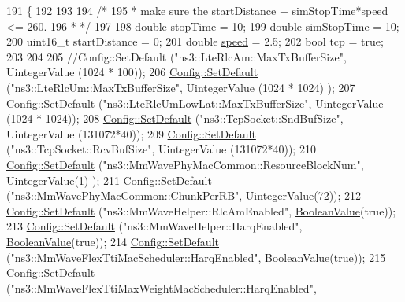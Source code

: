 \begin{DoxyCode}
191 \{
192 
193 
194 \textcolor{comment}{/*}
195 \textcolor{comment}{ * make sure the startDistance + simStopTime*speed <= 260.}
196 \textcolor{comment}{ * */}
197 
198         \textcolor{keywordtype}{double} stopTime = 10;
199         \textcolor{keywordtype}{double} simStopTime = 10;
200         uint16\_t startDistance = 0;
201         \textcolor{keywordtype}{double} \hyperlink{mmwave-amc-test_8cc_a6dc6e6f3c75c509ce943163afb5dade7}{speed} = 2.5;
202         \textcolor{keywordtype}{bool} tcp = \textcolor{keyword}{true};
203 
204 
205         \textcolor{comment}{//Config::SetDefault ("ns3::LteRlcAm::MaxTxBufferSize", UintegerValue (1024 * 100));}
206         \hyperlink{group__config_ga2e7882df849d8ba4aaad31c934c40c06}{Config::SetDefault} (\textcolor{stringliteral}{"ns3::LteRlcUm::MaxTxBufferSize"}, UintegerValue (1024 * 1024)
      );
207         \hyperlink{group__config_ga2e7882df849d8ba4aaad31c934c40c06}{Config::SetDefault} (\textcolor{stringliteral}{"ns3::LteRlcUmLowLat::MaxTxBufferSize"}, UintegerValue (1024 *
       1024));
208         \hyperlink{group__config_ga2e7882df849d8ba4aaad31c934c40c06}{Config::SetDefault} (\textcolor{stringliteral}{"ns3::TcpSocket::SndBufSize"}, UintegerValue (131072*40));
209         \hyperlink{group__config_ga2e7882df849d8ba4aaad31c934c40c06}{Config::SetDefault} (\textcolor{stringliteral}{"ns3::TcpSocket::RcvBufSize"}, UintegerValue (131072*40));
210         \hyperlink{group__config_ga2e7882df849d8ba4aaad31c934c40c06}{Config::SetDefault} (\textcolor{stringliteral}{"ns3::MmWavePhyMacCommon::ResourceBlockNum"}, UintegerValue(1)
      );
211         \hyperlink{group__config_ga2e7882df849d8ba4aaad31c934c40c06}{Config::SetDefault} (\textcolor{stringliteral}{"ns3::MmWavePhyMacCommon::ChunkPerRB"}, UintegerValue(72));
212         \hyperlink{group__config_ga2e7882df849d8ba4aaad31c934c40c06}{Config::SetDefault} (\textcolor{stringliteral}{"ns3::MmWaveHelper::RlcAmEnabled"}, 
      \hyperlink{classns3_1_1BooleanValue}{BooleanValue}(\textcolor{keyword}{true}));
213         \hyperlink{group__config_ga2e7882df849d8ba4aaad31c934c40c06}{Config::SetDefault} (\textcolor{stringliteral}{"ns3::MmWaveHelper::HarqEnabled"}, 
      \hyperlink{classns3_1_1BooleanValue}{BooleanValue}(\textcolor{keyword}{true}));
214         \hyperlink{group__config_ga2e7882df849d8ba4aaad31c934c40c06}{Config::SetDefault} (\textcolor{stringliteral}{"ns3::MmWaveFlexTtiMacScheduler::HarqEnabled"}, 
      \hyperlink{classns3_1_1BooleanValue}{BooleanValue}(\textcolor{keyword}{true}));
215         \hyperlink{group__config_ga2e7882df849d8ba4aaad31c934c40c06}{Config::SetDefault} (\textcolor{stringliteral}{"ns3::MmWaveFlexTtiMaxWeightMacScheduler::HarqEnabled"}, 

\end{DoxyCode}
